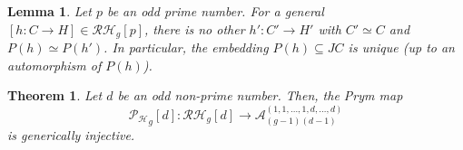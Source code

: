 \documentclass[10pt,a4paper]{amsart}
\newtheorem{lem}{Lemma}
\newtheorem{thm}{Theorem}
\DeclareMathOperator{\Image}{Im}
\begin{document}
\begin{lem}\label{lemunique}
    Let $p$ be an odd prime number.
    For a general $[h:C\to H]\in \mathcal{RH}_g[p]$, %
    there is no other $h':C'\to H'$ with $C'\simeq C$ and $P(h)\simeq P(h')$. 
    In particular, the embedding $P(h)\subseteq JC$ is unique (up to an automorphism of $P(h)$).
\end{lem}

\begin{thm}\label{mainodd}
Let $d$ be an odd non-prime number. Then, the Prym map  $$\mathcal{P_H}_g[d]: \mathcal{RH}_g[d]\to\mathcal{A}_{(g-1)(d-1)}^{(1,1,\ldots, 1,d,\dots,d)}$$ is generically injective.
\end{thm} 
\end{document}
